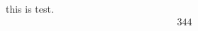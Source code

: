 \documentclass{ctexart}
\begin{document}
  this is test.
  \begin{align*}
         344  
  \end{align*}
\end{document}
